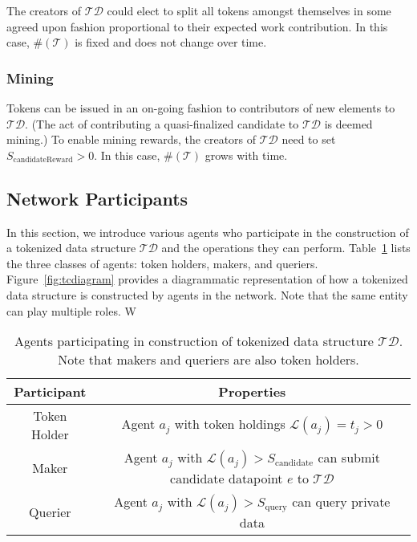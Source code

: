 \documentclass{llncs}
\begin{document}
The creators of $\mathcal{TD}$ could elect to split all tokens amongst themselves in some agreed upon fashion proportional to their expected work contribution. In this case, $\#(\mathcal{T})$ is fixed and does not change over time.

\subsubsection{Mining}

Tokens can be issued in an on-going fashion to contributors of new elements to $\mathcal{TD}$. (The act of contributing a quasi-finalized candidate to $\mathcal{TD}$ is deemed mining.) To enable mining rewards, the creators of $\mathcal{TD}$ need to set $S_\text{candidateReward} > 0$. In this case, $\#(\mathcal{T})$ grows with time.



\subsection{Network Participants}

In this section, we introduce various agents who participate in the construction of a tokenized data structure $\mathcal{TD}$ and the operations they can perform. Table~\ref{tab:agents} lists the three classes of agents: token holders, makers, and queriers. Figure~\ref{fig:tcdiagram} provides a diagrammatic representation of how a tokenized data structure is constructed by agents in the network. Note that the same entity can play multiple roles. W

\begin{table}[h!]
\begin{center}
\begin{tabular}{ |c|c| } 
 \hline
 \textbf{Participant} & \textbf{Properties} \\ 
 \hline
 Token Holder & Agent $a_j$ with token holdings $\mathcal{L}(a_j) = t_j > 0$ \\ 
 \hline
 Maker & Agent $a_j$ with $\mathcal{L}(a_j) > S_{\text{candidate}}$ can submit candidate datapoint $e$ to $\mathcal{TD}$ \\ 
 \hline
 Querier & Agent $a_j$ with $\mathcal{L}(a_j) > S_{\text{query}}$ can query private data \\
 \hline
\end{tabular}
\end{center}
\caption{Agents participating in construction of tokenized data structure $\mathcal{TD}$. Note that makers and queriers are also token holders.}
\label{tab:agents}
\end{table}
\end{document}
